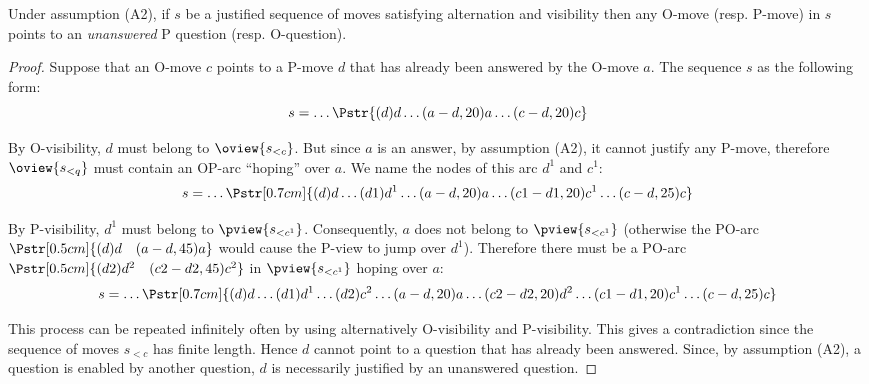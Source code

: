\begin{lemma}
\label{lem:justfied_by_unanswered}
Under assumption (A2), if $s$ be a justified sequence of moves satisfying alternation and visibility then any O-move (resp. P-move) in $s$ points to an \emph{unanswered} P question (resp. O-question).
\end{lemma}
\begin{proof}
Suppose that an O-move $c$ points to a P-move $d$ that has already been answered by the O-move $a$. The sequence $s$ as the following form:
$$ s= \ldots \Pstr{(d){d}  \ldots  (a-d,20){a}  \ldots  (c-d,20){c}}$$

By O-visibility, $d$ must belong to $\oview{s_{<c}}$. But since $a$ is an answer, by assumption (A2), it cannot justify any P-move, therefore
$\oview{s_{<q}}$ must contain an OP-arc ``hoping'' over $a$. We name the nodes of this arc $d^1$ and $c^1$:
$$ s = \ldots \Pstr[0.7cm]{(d){d}  \ldots  (d1){d^1} \ldots (a-d,20){a} \ldots
 (c1-d1,20){c^1} \ldots (c-d,25){c}}$$

By P-visibility, $d^1$ must belong to $\pview{s_{<c^1}}$. Consequently, $a$ does not belong to $\pview{s_{<c^1}}$ (otherwise the PO-arc $\Pstr[0.5cm]{(d){d} \quad (a-d,45){a}}$ would cause the P-view to jump over $d^1$).
Therefore there must be a PO-arc $\Pstr[0.5cm]{(d2){d^2} \quad (c2-d2,45){c^2}}$ in $\pview{s_{<c^1}}$ hoping over $a$:
$$s = \ldots \Pstr[0.7cm]{(d){d}  \ldots
(d1){d^1} \ldots (d2){c^2} \ldots
(a-d,20){a} \ldots
 (c2-d2,20){d^2} \ldots (c1-d1,20){c^1} \ldots (c-d,25){c}}$$

This process can be repeated infinitely often by using alternatively O-visibility and P-visibility. This gives a contradiction since the sequence of moves $s_{<c}$ has finite length.
Hence $d$ cannot point to a question that has already been answered. Since, by assumption (A2), a question is enabled by another question, $d$ is necessarily justified by an unanswered question.
\end{proof}


